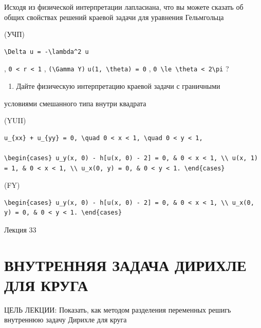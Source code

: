 \documentclass[
  ukrainian,
]{article}
\providecommand{\tightlist}{%
  \setlength{\itemsep}{0pt}\setlength{\parskip}{0pt}}
\begin{document}
Исходя из физической интерпретации лапласиана, что вы можете сказать об
общих свойствах решений краевой задачи для уравнения Гельмгольца

(УЧП)

\begin{verbatim}
\Delta u = -\lambda^2 u
\end{verbatim}

, \texttt{0\ \textless{}\ r\ \textless{}\ 1} ,
\texttt{(\textbackslash{}Gamma\ Y)}
\texttt{u(1,\ \textbackslash{}theta)\ =\ 0} ,
\texttt{0\ \textbackslash{}le\ \textbackslash{}theta\ \textless{}\ 2\textbackslash{}pi}
?

\begin{enumerate}
\def\labelenumi{\arabic{enumi}.}
\setcounter{enumi}{5}
\tightlist
\item
  Дайте физическую интерпретацию краевой задачи с граничными
\end{enumerate}

условиями смешанного типа внутри квадрата

(YUII)

\begin{verbatim}
u_{xx} + u_{yy} = 0, \quad 0 < x < 1, \quad 0 < y < 1,

\begin{cases} u_y(x, 0) - h[u(x, 0) - 2] = 0, & 0 < x < 1, \\ u(x, 1) = 1, & 0 < x < 1, \\ u_x(0, y) = 0, & 0 < y < 1. \end{cases}
\end{verbatim}

(FY)

\begin{verbatim}
\begin{cases} u_y(x, 0) - h[u(x, 0) - 2] = 0, & 0 < x < 1, \\ u_x(0, y) = 0, & 0 < y < 1. \end{cases}
\end{verbatim}

Лекция 33

\section{ВНУТРЕННЯЯ ЗАДАЧА ДИРИХЛЕ ДЛЯ
КРУГА}\label{ux432ux43dux443ux442ux440ux435ux43dux43dux44fux44f-ux437ux430ux434ux430ux447ux430-ux434ux438ux440ux438ux445ux43bux435-ux434ux43bux44f-ux43aux440ux443ux433ux430}

ЦЕЛЬ ЛЕКЦИИ: Показать, как методом разделения переменных решигь
внутреннюю задачу Дирихле для круга
\end{document}
